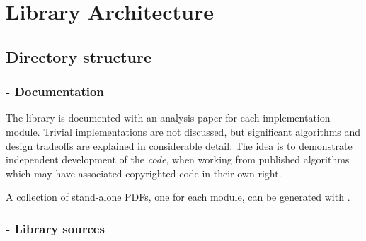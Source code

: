 \section{Library Architecture}

\subsection{Directory structure}

\subsubsection{ - Documentation}

The library is documented with an analysis paper for each
implementation module.  Trivial implementations are not
discussed, but significant algorithms and design tradeoffs
are explained in considerable detail.  The idea is to
demonstrate independent development of the {\em code}, when
working from published algorithms which may have associated
copyrighted code in their own right.

A collection of stand-alone PDFs, one for each module,
can be generated with .

\subsubsection{ - Library sources}


